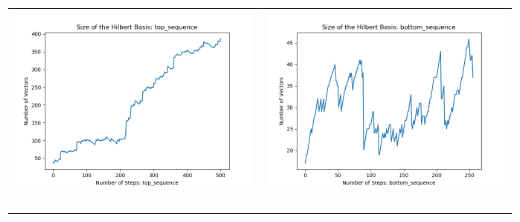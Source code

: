 \documentclass[10pt]{article}
\begin{document}
\begin{tabular}{c|c}
\begin{minipage}{.45\textwidth}
\includegraphics[width=\textwidth]{"DATA/4d/5 generators 2 bound J/top_sequence SIZE"}
\end{minipage} &
\begin{minipage}{.45\textwidth}
\includegraphics[width=\textwidth]{"DATA/4d/5 generators 2 bound J bottomup/bottom_sequence SIZE"}
\end{minipage} \\ \\
\hline \\\begin{minipage}{.45\textwidth}

\end{minipage}
\end{tabular}
\end{document}
